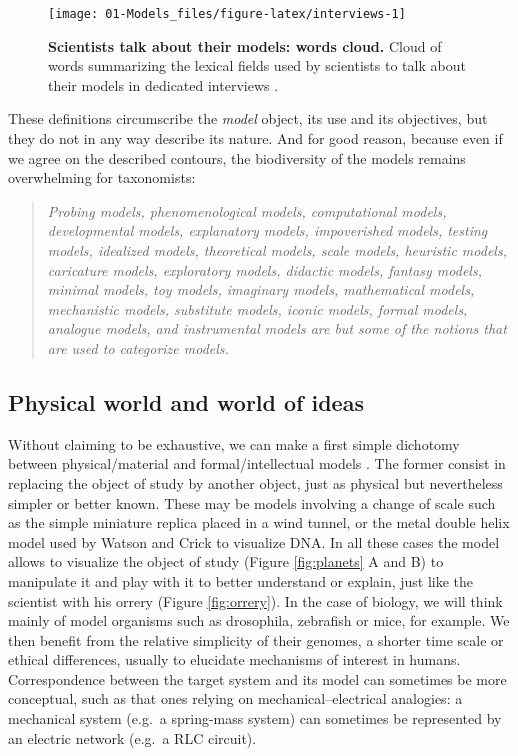 \documentclass[a4paper,12pt,twoside,onecolumn,openright,final,oldfontcommands]{memoir}
\begin{document}
\begin{figure}

{\centering \texttt{[image: 01-Models\_files/figure-latex/interviews-1]} 

}

\caption[Scientists talk about their models: words cloud.]{\textbf{Scientists talk about their models:
words cloud.} Cloud of words summarizing the lexical fields used by
scientists to talk about their models in dedicated interviews
\citep{bailer2002scientists}.}\label{fig:interviews}
\end{figure}






These definitions circumscribe the \emph{model} object, its use and its
objectives, but they do not in any way describe its nature. And for good
reason, because even if we agree on the described contours, the
biodiversity of the models remains overwhelming for taxonomists:

\begin{quote}
\emph{Probing models, phenomenological models, computational models,
developmental models, explanatory models, impoverished models, testing
models, idealized models, theoretical models, scale models, heuristic
models, caricature models, exploratory models, didactic models, fantasy
models, minimal models, toy models, imaginary models, mathematical
models, mechanistic models, substitute models, iconic models, formal
models, analogue models, and instrumental models are but some of the
notions that are used to categorize models.}\\
\citep{frigg2020models}
\end{quote}

\subsection{Physical world and world of
ideas}\label{physical-world-and-world-of-ideas}

Without claiming to be exhaustive, we can make a first simple dichotomy
between physical/material and formal/intellectual models
\citep{rosenblueth1945role}. The former consist in replacing the object
of study by another object, just as physical but nevertheless simpler or
better known. These may be models involving a change of scale such as
the simple miniature replica placed in a wind tunnel, or the metal
double helix model used by Watson and Crick to visualize DNA. In all
these cases the model allows to visualize the object of study (Figure
\ref{fig:planets} A and B) to manipulate it and play with it to better
understand or explain, just like the scientist with his orrery (Figure
\ref{fig:orrery}). In the case of biology, we will think mainly of model
organisms such as drosophila, zebrafish or mice, for example. We then
benefit from the relative simplicity of their genomes, a shorter time
scale or ethical differences, usually to elucidate mechanisms of
interest in humans. Correspondence between the target system and its
model can sometimes be more conceptual, such as that ones relying on
mechanical--electrical analogies: a mechanical system (e.g.~a
spring-mass system) can sometimes be represented by an electric network
(e.g.~a RLC circuit).
\end{document}
